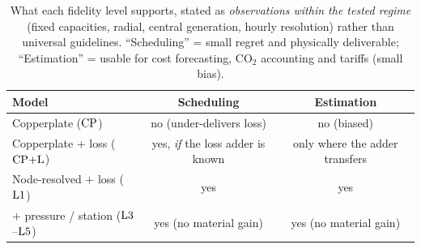 \begin{table}[t]
\centering
\caption{What each fidelity level supports, stated as \emph{observations within the tested
regime} (fixed capacities, radial, central generation, hourly resolution) rather than universal
guidelines. ``Scheduling'' = small regret and physically deliverable; ``Estimation'' = usable for
cost forecasting, CO$_2$ accounting and tariffs (small bias).}
\label{tab:criteria}
\begin{tabular}{lcc}
\hline
Model & Scheduling & Estimation \\
\hline
Copperplate ($\mathrm{CP}$) & no (under-delivers loss) & no (biased) \\
Copperplate + loss ($\mathrm{CP{+}L}$) & yes, \emph{if} the loss adder is known & only where the adder transfers \\
Node-resolved + loss ($\mathrm{L1}$) & yes & yes \\
$+$ pressure / station ($\mathrm{L3}$--$\mathrm{L5}$) & yes (no material gain) & yes (no material gain) \\
\hline
\end{tabular}
\end{table}
